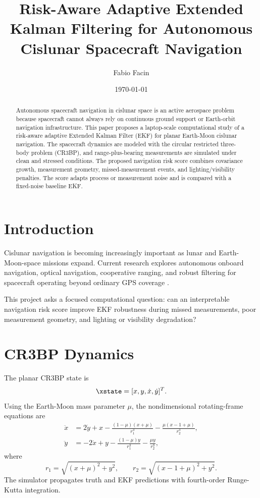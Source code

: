 \documentclass[11pt]{article}
\title{Risk-Aware Adaptive Extended Kalman Filtering for Autonomous Cislunar Spacecraft Navigation}
\author{Fabio Facin}
\date{\today}
\begin{document}
\maketitle

\begin{abstract}
Autonomous spacecraft navigation in cislunar space is an active aerospace
problem because spacecraft cannot always rely on continuous ground support or
Earth-orbit navigation infrastructure. This paper proposes a laptop-scale
computational study of a risk-aware adaptive Extended Kalman Filter (EKF) for
planar Earth-Moon cislunar navigation. The spacecraft dynamics are modeled with
the circular restricted three-body problem (CR3BP), and range-plus-bearing
measurements are simulated under clean and stressed conditions. The proposed
navigation risk score combines covariance growth, measurement geometry,
missed-measurement events, and lighting/visibility penalties. The score adapts
process or measurement noise and is compared with a fixed-noise baseline EKF.
\end{abstract}

\section{Introduction}

Cislunar navigation is becoming increasingly important as lunar and
Earth-Moon-space missions expand. Current research explores autonomous onboard
navigation, optical navigation, cooperative ranging, and robust filtering for
spacecraft operating beyond ordinary GPS coverage
\citep{AerospaceNASA2025Cislunar,NASA2024OpticalNavigation,OguriCislunarAutonomy}.

This project asks a focused computational question: can an interpretable
navigation risk score improve EKF robustness during missed measurements, poor
measurement geometry, and lighting or visibility degradation?

\section{CR3BP Dynamics}

The planar CR3BP state is
\begin{equation}
  \xstate = [x, y, \dot{x}, \dot{y}]^T.
\end{equation}
Using the Earth-Moon mass parameter $\mu$, the nondimensional rotating-frame
equations are
\begin{align}
  \ddot{x} &= 2\dot{y} + x
  - \frac{(1-\mu)(x+\mu)}{r_1^3}
  - \frac{\mu(x-1+\mu)}{r_2^3},\\
  \ddot{y} &= -2\dot{x} + y
  - \frac{(1-\mu)y}{r_1^3}
  - \frac{\mu y}{r_2^3},
\end{align}
where
\begin{equation}
  r_1 = \sqrt{(x+\mu)^2+y^2},\qquad
  r_2 = \sqrt{(x-1+\mu)^2+y^2}.
\end{equation}
The simulator propagates truth and EKF predictions with fourth-order
Runge-Kutta integration.
\end{document}
